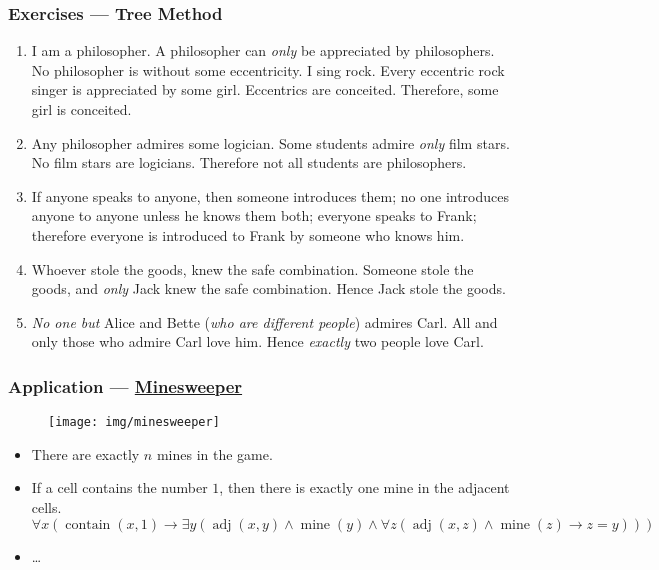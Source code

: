 \documentclass[UTF8,aspectratio=43,11pt,colorlinks,compress,openany]{beamer}%
\begin{document}
\begin{frame}\frametitle{Exercises --- Tree Method}
		\begin{enumerate}
			\item I am a philosopher. A philosopher can \emph{only} be appreciated by philosophers. No philosopher is without some eccentricity. I sing rock. Every eccentric rock singer is appreciated by some girl. Eccentrics are conceited. Therefore, some girl is conceited.
			\item Any philosopher admires some logician. Some students admire \emph{only} film stars. No film stars are logicians. Therefore not all students are philosophers.
			\item If anyone speaks to anyone, then someone introduces them; no one introduces anyone to anyone unless he knows them both; everyone speaks to Frank; therefore everyone is introduced to Frank by someone who knows him.
			\item Whoever stole the goods, knew the safe combination. Someone stole the goods, and \emph{only} Jack knew the safe combination. Hence Jack stole the goods.
			\item \emph{No one but} Alice and Bette (\emph{who are different people}) admires Carl. All and only those who admire Carl love him. Hence \emph{exactly} two people love Carl.
		\end{enumerate}
\end{frame}

\begin{frame}\frametitle{Application --- \href{http://web.mat.bham.ac.uk/R.W.Kaye/minesw/}{Minesweeper}}\vspace{-5pt}
	\begin{figure}
		\texttt{[image: img/minesweeper]}
	\end{figure}\vspace{-7pt}
	\begin{itemize}
		\item There are exactly $n$ mines in the game.
		\item If a cell contains the number $1$, then there is exactly one mine in the adjacent cells.\\
		$\forall x(\operatorname{contain}(x,1)\to\exists y(\operatorname{adj}(x,y)\wedge \operatorname{mine}(y)\wedge\forall z(\operatorname{adj}(x,z)\wedge \operatorname{mine}(z)\to z=y)))$
		\item \dots
	\end{itemize}
\end{frame}
\end{document}
